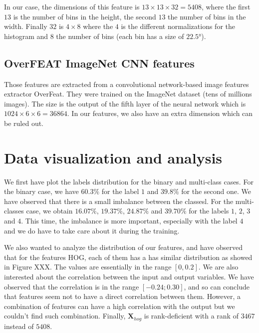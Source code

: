 \documentclass{article} %
\begin{document}
In our case, the dimensions of this feature is $13 \times 13 \times 32=5408$, where the first $13$ is the number of bins in the height, the second $13$ the number of bins in the width. Finally $32$ is $4 \times 8$ where the $4$ is the different normalizations for the histogram and $8$ the number of bins (each bin has a size of $22.5°$). 

\subsection{OverFEAT ImageNet CNN features}

Those features are extracted from a convolutional network-based image features extractor OverFeat. They were trained on the ImageNet dataset (tens of millions images). The size is the output of the fifth layer of the neural network which is $1024 \times 6 \times 6 = 36864$. In our features, we also have an extra dimension which can be ruled out.

\section{Data visualization and analysis}

We first have plot the labels distribution for the binary and multi-class cases. For the binary case, we have $60.3\%$ for the label $1$ and $39.8\%$ for the second one. We have observed that there is a small imbalance between the classesl. For the multi-classes case, we obtain $16.07\%$, $19.37\%$, $24.87\%$ and $39.70\%$ for the labels $1$, $2$, $3$ and $4$. This time, the imbalance is more important, especially with the label $4$ and we do have to take care about it during the training.

We also wanted to analyze the distribution of our features, and have observed that for the features HOG, each of them has a has similar distribution as showed in Figure XXX. The values are essentially in the range $[0, 0.2]$. We are also interested about the correlation between the input and output variables. We have observed that the correlation is in the range $[-0.24 ;0.30]$, and so can conclude that features seem not to have a direct correlation between them. However, a combination of features can have a high correlation with the output but we couldn't find such combination. Finally, $\mathbf{X}_{hog}$ is rank-deficient with a rank of $3467$ instead of $5408$.
\end{document}
